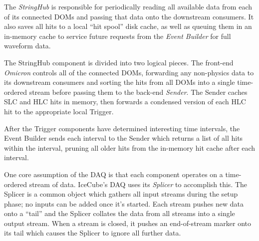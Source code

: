 The \emph{StringHub} is responsible for periodically reading all available data
from each of its connected DOMs and passing that data onto the downstream
consumers.  It also saves all hits to a local ``hit spool'' disk cache, as
well as queuing them in an in-memory cache to service future requests from
the \emph{Event Builder} for full waveform data.

The StringHub component is divided into two logical pieces.  The front-end
\emph{Omicron} controls all of the connected DOMs, forwarding any
non-physics data to its downstream consumers and sorting the hits from all
DOMs into a single time-ordered stream
before passing them to the back-end \emph{Sender}.  The Sender
caches SLC and HLC hits in memory, then forwards a condensed version of
each HLC hit to the appropriate local Trigger.


After the Trigger components have determined interesting time intervals, the
Event Builder sends each interval to the Sender which returns a list
of all hits within the interval, pruning all older
hits from the in-memory hit cache after each interval.


One core assumption of the DAQ is that each component operates on a
time-ordered stream of data.  IceCube's DAQ uses its \emph{Splicer} to
accomplish this.  The Splicer is a common object which gathers all input
streams during the setup phase; no inputs can be added once it's started.  Each
stream pushes new data onto a ``tail'' and the Splicer collates
the data from all streams into a single output stream.  When a
stream is closed, it pushes an end-of-stream marker onto its tail which causes
the Splicer to ignore all further data.


